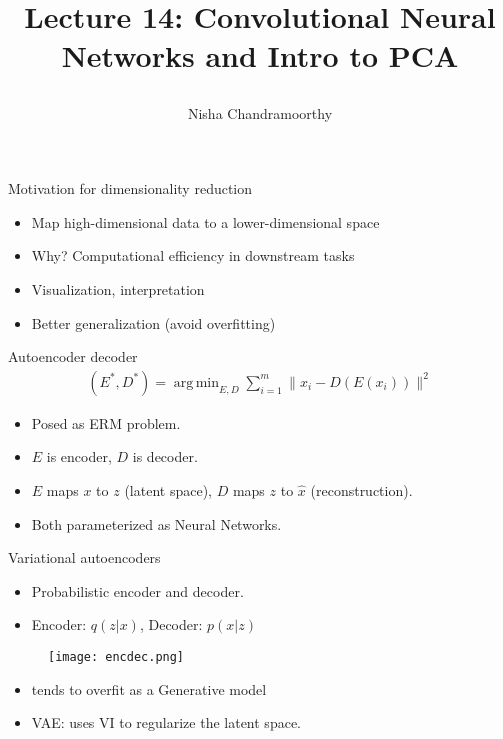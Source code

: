 \documentclass[final]{beamer}
\title{\begin{huge}{Lecture 14: Convolutional Neural Networks and Intro to PCA}\end{huge}} %
\author{Nisha Chandramoorthy} %
\DeclareMathOperator*{\argmin}{arg\,min}
\begin{document}
\frame{\titlepage}

\begin{frame}{Motivation for dimensionality reduction}
	\begin{itemize}
		\item Map high-dimensional data to a lower-dimensional space
		\pause
		\item Why? Computational efficiency in downstream tasks
		\pause
		\item Visualization, interpretation
		\pause
		\item Better generalization (avoid overfitting)

			
	\end{itemize}
\end{frame}
\begin{frame}{Autoencoder decoder}
	\begin{align}
		(E^*, D^*) = \argmin_{E, D} \sum_{i=1}^m \|x_i - D(E(x_i))\|^2
	\end{align}
	\begin{itemize}
	\item Posed as ERM problem.
	\pause
	\item $E$ is encoder, $D$ is decoder. 
	\pause
\item $E$ maps $x$ to $z$ (latent space), $D$ maps $z$ to $\hat{x}$ (reconstruction).
	\pause
\item Both parameterized as Neural Networks.
	\end{itemize}
\end{frame}
\begin{frame}{Variational autoencoders}
	\begin{itemize}
	\item Probabilistic encoder and decoder.
	\pause
	\item Encoder: $q(z|x)$, Decoder: $p(x|z)$
	\end{itemize}

\end{frame}
\begin{frame}
	\begin{figure}
		\texttt{[image: encdec.png]}
	\end{figure}
	\begin{itemize}
		\item tends to overfit as a Generative model
		\pause
		\item VAE: uses VI to regularize the latent space.
	\end{itemize}
\end{frame}
\end{document}
